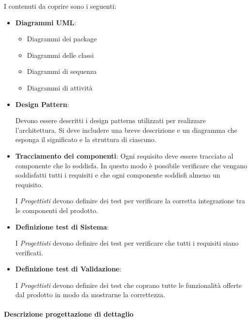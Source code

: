 I contenuti da coprire sono i seguenti:

\begin{itemize}
\item \textbf{Diagrammi UML}:
  \begin{itemize}
  \item Diagrammi dei package
  \item Diagrammi delle classi
  \item Diagrammi di sequenza
  \item Diagrammi di attività
  \end{itemize}
\item \textbf{Design Pattern}:

  Devono essere descritti i design patterns utilizzati per realizzare
  l'architettura. Si deve includere una breve descrizione e un
  diagramma che esponga il significato e la struttura di ciascuno. 

\item \textbf{Tracciamento dei componenti}:
  Ogni requisito deve essere tracciato al componente che lo
  soddisfa. In questo modo è possibile verificare che vengano
  soddisfatti tutti i requisiti e che ogni componente soddisfi almeno
  un requisito.  



I \textit{Progettisti} devono definire dei test per verificare la corretta integrazione tra le componenti del prodotto.

\item \textbf{Definizione test di Sistema}:

I \textit{Progettisti} devono definire dei test per verificare che tutti i requisiti siano verificati.

\item \textbf{Definizione test di Validazione}:

I \textit{Progettisti} devono definire dei test che coprano tutte le funzionalità offerte dal prodotto in modo da mostrarne la correttezza.





\end{itemize}

\paragraph{Descrizione progettazione di dettaglio}

